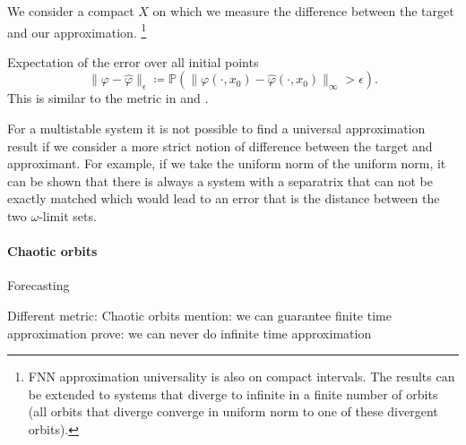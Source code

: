 \documentclass{article}
\theoremstyle{definition}
\theoremstyle{remark}
\newcommand{\vol}{\operatorname{vol}}
\newcounter{ct}
\begin{document}
We consider a compact $X$ on which we measure the difference between the target and our approximation.
\footnote{FNN approximation universality is also on compact intervals.
The results can be extended to systems that diverge to infinite in a finite number of orbits (all orbits that diverge converge in uniform norm to one of these divergent orbits).}

Expectation of the error over all initial points
\begin{equation}
\|\varphi-\hat \varphi\|_\epsilon \coloneqq  \mathbb{P}\left(\|\varphi(\cdot,x_0)-\hat \varphi(\cdot,x_0)\|_\infty>\epsilon\right).
\end{equation}
This is similar to the metric in \citep{hammer2000approximation} and \citep{hanson2021learning}.

For a multistable system it is not possible to find a universal approximation result if we consider a more strict notion of difference between the target and approximant.
For example, if we take the uniform norm of the uniform norm, it can be shown that there is always a system with a separatrix that can not be exactly matched which would lead to an error that is the distance between the two $\omega$-limit sets.



\paragraph{Chaotic orbits}
Forecasting
\citep{jaeger2004harnessing}
\citep{fan2020long}
\citep{vlachas2020backpropagation}
\citep{grigoryeva2024forecasting}

Different metric: Chaotic orbits
mention: we can guarantee finite time approximation
prove: we can never do infinite time approximation 
\end{document}
